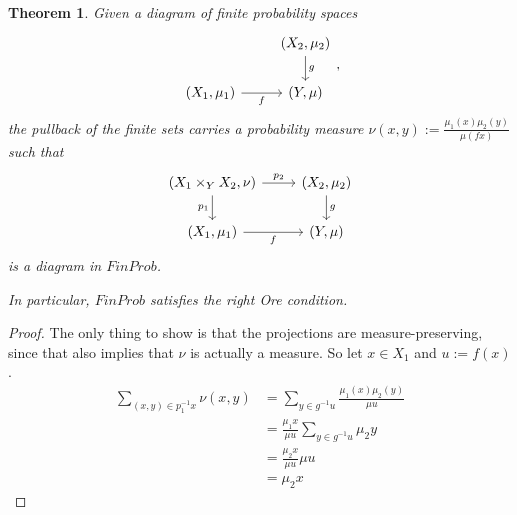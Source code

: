 \documentclass[a4paper]{amsproc}
\theoremstyle{plain}
\newtheorem{theorem}{Theorem}[section]
\theoremstyle{definition}
\theoremstyle{remark}
\numberwithin{equation}{section}
\begin{document}
\begin{theorem} \label{pullback_measure}
Given a diagram of finite probability spaces
\[
\begin{tikzcd}
                               & {(X_2,\mu_2)} \arrow[d, "g"] \\
{(X_1, \mu_1)} \arrow[r, "f"'] & {(Y,\mu)}                   
\end{tikzcd},
\]
the pullback of the finite sets carries a probability measure $\nu(x,y) := \frac{\mu_1(x) \mu_2(y)}{\mu(f x)}$ such that
\[
\begin{tikzcd}
{(X_1 \times_Y X_2, \nu)} \arrow[d, "p_1"'] \arrow[r, "p_2"] & {(X_2,\mu_2)} \arrow[d, "g"] \\
{(X_1, \mu_1)} \arrow[r, "f"']                               & {(Y,\mu)}                   
\end{tikzcd}
\]
is a diagram in $FinProb$.

In particular, $FinProb$ satisfies the right Ore condition.
\end{theorem}
\begin{proof}
The only thing to show is that the projections are measure-preserving, since that also implies that $\nu$ is actually a measure. So let $x \in X_1$ and $u := f(x)$.
\begin{align*}
\sum_{(x,y) \in p_1^{-1} x} \nu(x,y) &= \sum_{y \in g^{-1} u} \frac{\mu_1(x)\mu_2(y)}{\mu u} \\
&= \frac{\mu_1 x}{\mu u} \sum_{y \in g^{-1} u} \mu_2 y \\
&= \frac{\mu_2 x}{\mu u} \mu u \\
&= \mu_2 x
\end{align*}
\end{proof}
\end{document}
